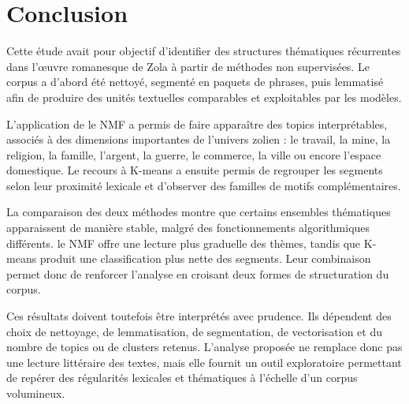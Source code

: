 \section{Conclusion}

Cette étude avait pour objectif d'identifier des structures thématiques récurrentes dans l'œuvre romanesque de Zola à partir de méthodes non supervisées. Le corpus a d'abord été nettoyé, segmenté en paquets de phrases, puis lemmatisé afin de produire des unités textuelles comparables et exploitables par les modèles.

L'application de le NMF a permis de faire apparaître des topics interprétables, associés à des dimensions importantes de l'univers zolien : le travail, la mine, la religion, la famille, l'argent, la guerre, le commerce, la ville ou encore l'espace domestique. Le recours à K-means a ensuite permis de regrouper les segments selon leur proximité lexicale et d'observer des familles de motifs complémentaires.

La comparaison des deux méthodes montre que certains ensembles thématiques apparaissent de manière stable, malgré des fonctionnements algorithmiques différents. le NMF offre une lecture plus graduelle des thèmes, tandis que K-means produit une classification plus nette des segments. Leur combinaison permet donc de renforcer l'analyse en croisant deux formes de structuration du corpus.

Ces résultats doivent toutefois être interprétés avec prudence. Ils dépendent des choix de nettoyage, de lemmatisation, de segmentation, de vectorisation et du nombre de topics ou de clusters retenus. L'analyse proposée ne remplace donc pas une lecture littéraire des textes, mais elle fournit un outil exploratoire permettant de repérer des régularités lexicales et thématiques à l'échelle d'un corpus volumineux.
